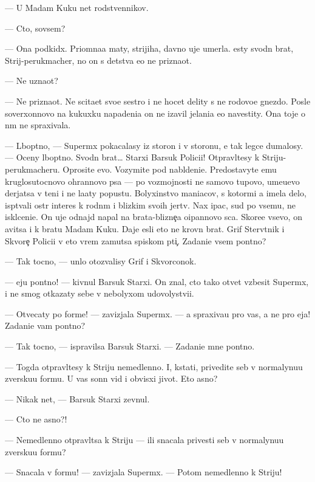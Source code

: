\documentclass[12pt]{book}
\begin{document}
— U Madam Kuku net rodstvennikov.

— Cto, sovsem?

— Ona podkid{\yi}x. Pri{\y}omna{\y}a maty, strijiha, davno uje umerla. {\Y}esty svod\-n{\yi}{\y} brat, Strij-perukmacher, no on s detstva {\y}e{\y}o ne prizna{\y}ot.

— Ne uzna{\y}ot?

— Ne prizna{\y}ot. Ne sci\-ta\-{\y}et svo{\y}e{\y} sestro{\y} i ne hocet delity s ne{\y} rodovo{\y}e gnezdo. Posle soverxonnovo na kukuxku napadeni{\y}a on ne iz{\y}avil jelani{\y}a {\y}e{\y}o navestity. Ona toje o n{\e}m ne spraxivala.

— L{\io}bop{\yi}tno, — Superm{\yi}x pokacalasy iz storon{\yi} i v storonu, {\y}e{\y} tak legce dumalosy. — Oceny l{\io}bop{\yi}tno. Svodn{\yi}{\y} brat… Starxi{\y} Barsuk Polici{\y}i! Ot\-prav\-l{\ia}{\y}\-tesy k Striju-perukmacheru. Oprosite {\y}evo. Vozymite pod nabl{\io}deni{\y}e. Predostavyte {\y}emu kruglosutocnovo ohrannovo psa — po vozmojnosti ne samovo tupovo, ume{\y}u{\x}evo derjatsa v teni i ne la{\y}aty popustu. Bolyxinstvo maniacov, s ko\-to\-r{\yi}\-mi {\y}a imela delo, isp{\yi}t{\yi}vali ostr{\yi}{\y} interes k rodn{\yi}m i blizkim svo{\y}ih jertv. Nax {\X}ipac, sud{\ia} po vsemu, ne iskl{\io}ceni{\y}e. On uje od\-naj\-d{\yi} napal na brata-blizne{\c}a o{\x}ipannovo s{\yi}ca. Skore{\y}e vsevo, on {\y}avitsa i k bratu Madam Kuku. Daje {\y}esli eto ne krovn{\yi}{\y} brat. Grif Sterv{\ia}tnik i Skvore{\c} Polici{\y}i v eto vrem{\ia} za{\y}mutsa spiskom pti{\c}. Zadani{\y}e vsem pon{\ia}tno?

— Tak tocno, — un{\yi}lo otozvalisy Grif i Skvorconok.

— {\Y}eju pon{\ia}tno! — kivnul Barsuk Starxi{\y}. On znal, cto tako{\y} otvet vzbesit Superm{\yi}x, i ne smog otkazaty sebe v nebolyxom udovolystvi{\y}i.

— Otvecaty po forme! — zavizjala Superm{\yi}x. — {\Y}a spraxiva{\y}u pro vas, a ne pro {\y}eja! Zadani{\y}e vam pon{\ia}tno?

— Tak tocno, — ispravilsa Barsuk Starxi{\y}. — Zadani{\y}e mne pon{\ia}tno.

— Togda otpravl{\ia}{\y}tesy k Striju nemedlenno. I, kstati, privedite seb{\ia} v nor\-maly\-nu\-{\y}u zversku{\y}u formu. U vas sonn{\yi}{\y} vid i obvisxi{\y} jivot. Eto {\y}asno?

— Nikak net, — Barsuk Starxi{\y} zevnul.

— Cto ne {\y}asno?!

— Nemedlenno otpravl{\ia}tsa k Striju — ili snacala privesti seb{\ia} v nor\-maly\-nu\-{\y}u zversku{\y}u formu?

— Snacala v formu! — zavizjala Superm{\yi}x. — Potom nemedlenno k Striju!
\end{document}
